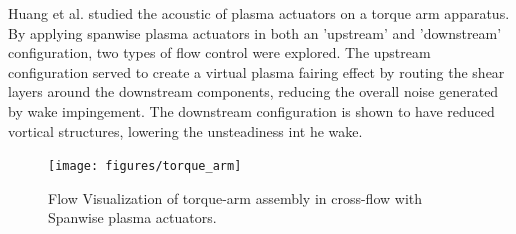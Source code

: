 Huang et al. studied the acoustic of plasma actuators on a torque arm apparatus. By applying spanwise plasma actuators in both an 'upstream' and 'downstream' configuration, two types of flow control were explored. The upstream configuration served to create a virtual plasma fairing effect by routing the shear layers around the downstream components, reducing the overall noise generated by wake impingement. The downstream configuration is shown to have reduced vortical structures, lowering the unsteadiness int he wake. 
\cite{huang1}
\cite{huang2}

\begin{figure}
	\begin{center}
		\centerline{\texttt{[image: figures/torque\_arm]}}
		\caption{Flow Visualization of torque-arm assembly in cross-flow with Spanwise plasma actuators.}
		\label{fig:cyl2}
	\end{center}
\end{figure}


